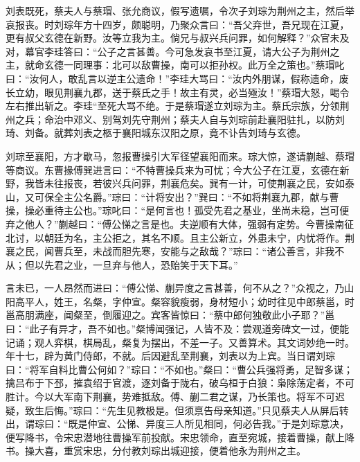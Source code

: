 刘表既死，蔡夫人与蔡瑁、张允商议，假写遗嘱，令次子刘琮为荆州之主，然后举哀报丧。时刘琮年方十四岁，颇聪明，乃聚众言曰：“吾父弃世，吾兄现在江夏，更有叔父玄德在新野。汝等立我为主。倘兄与叔兴兵问罪，如何解释？”众官未及对，幕官李珪答曰：“公子之言甚善。今可急发哀书至江夏，请大公子为荆州之主，就命玄德一同理事：北可以敌曹操，南可以拒孙权。此万全之策也。”蔡瑁叱曰：“汝何人，敢乱言以逆主公遗命！”李珪大骂曰：“汝内外朋谋，假称遗命，废长立幼，眼见荆襄九郡，送于蔡氏之手！故主有灵，必当殛汝！”蔡瑁大怒，喝令左右推出斩之。李珪“至死大骂不绝。于是蔡瑁遂立刘琮为主。蔡氏宗族，分领荆州之兵；命治中邓义、别驾刘先守荆州；蔡夫人自与刘琮前赴襄阳驻扎，以防刘琦、刘备。就葬刘表之柩于襄阳城东汉阳之原，竟不讣告刘琦与玄德。

刘琮至襄阳，方才歇马，忽报曹操引大军径望襄阳而来。琮大惊，遂请蒯越、蔡瑁等商议。东曹掾傅巽进言曰：“不特曹操兵来为可忧；今大公子在江夏，玄德在新野，我皆未往报丧，若彼兴兵问罪，荆襄危矣。巽有一计，可使荆襄之民，安如泰山，又可保全主公名爵。”琮曰：“计将安出？”巽曰：“不如将荆襄九郡，献与曹操，操必重待主公也。”琮叱曰：“是何言也！孤受先君之基业，坐尚未稳，岂可便弃之他人？”蒯越曰：“傅公悌之言是也。夫逆顺有大体，强弱有定势。今曹操南征北讨，以朝廷为名，主公拒之，其名不顺。且主公新立，外患未宁，内忧将作。荆襄之民，闻曹兵至，未战而胆先寒，安能与之敌哉？”琮曰：“诸公善言，非我不从；但以先君之业，一旦弃与他人，恐贻笑于天下耳。”

言未已，一人昂然而进曰：“傅公悌、蒯异度之言甚善，何不从之？”众视之，乃山阳高平人，姓王，名粲，字仲宣。粲容貌瘦弱，身材短小；幼时往见中郎蔡邕，时邕高朋满座，闻粲至，倒履迎之。宾客皆惊曰：“蔡中郎何独敬此小子耶？”邕曰：“此子有异才，吾不如也。”粲博闻强记，人皆不及：尝观道旁碑文一过，便能记诵；观人弈棋，棋局乱，粲复为摆出，不差一子。又善算术。其文词妙绝一时。年十七，辟为黄门侍郎，不就。后因避乱至荆襄，刘表以为上宾。当日谓刘琮曰：“将军自料比曹公何如？”琮曰：“不如也。”粲曰：“曹公兵强将勇，足智多谋；擒吕布于下邳，摧袁绍于官渡，逐刘备于陇右，破乌桓于白狼：枭除荡定者，不可胜计。今以大军南下荆襄，势难抵敌。傅、蒯二君之谋，乃长策也。将军不可迟疑，致生后悔。”琮曰：“先生见教极是。但须禀告母亲知道。”只见蔡夫人从屏后转出，谓琮曰：“既是仲宣、公悌、异度三人所见相同，何必告我。”于是刘琮意决，便写降书，令宋忠潜地往曹操军前投献。宋忠领命，直至宛城，接着曹操，献上降书。操大喜，重赏宋忠，分付教刘琮出城迎接，便着他永为荆州之主。

